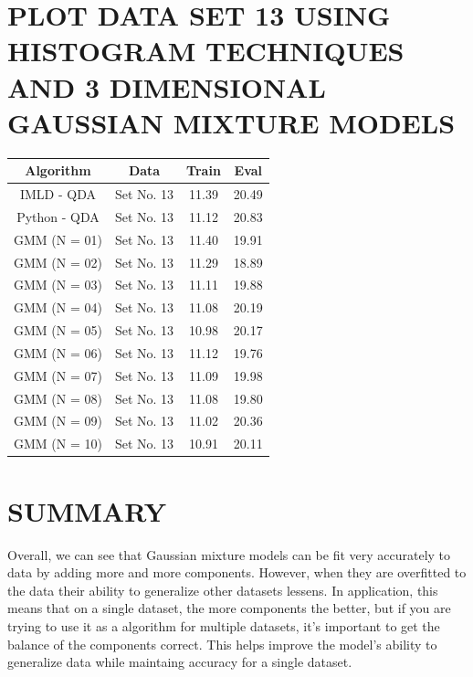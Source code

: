 \documentclass{article}
\begin{document}
\section{\MakeUppercase{Plot data set 13 using histogram techniques and 3 dimensional Gaussian mixture models}}
\begin{table}[ht]
\centering
\renewcommand{\arraystretch}{1.5}
\begin{tabular}{|c|c|c|c|}
	\hline
	\rowcolor{gray!20}
	Algorithm & Data & Train & Eval\\
	\hline 
	IMLD - QDA   & Set No. 13 & 11.39 & 20.49\\
	\hline
	Python - QDA & Set No. 13 & 11.12 & 20.83\\
	\hline
	GMM (N = 01) & Set No. 13 & 11.40 & 19.91\\
	\hline
	GMM (N = 02) & Set No. 13 & 11.29 & 18.89\\
	\hline
	GMM (N = 03) & Set No. 13 & 11.11 & 19.88\\
	\hline
	GMM (N = 04) & Set No. 13 & 11.08 & 20.19\\
	\hline
	GMM (N = 05) & Set No. 13 & 10.98 & 20.17\\
	\hline
	GMM (N = 06) & Set No. 13 & 11.12 & 19.76\\
	\hline
	GMM (N = 07) & Set No. 13 & 11.09 & 19.98\\
	\hline
	GMM (N = 08) & Set No. 13 & 11.08 & 19.80\\
	\hline
	GMM (N = 09) & Set No. 13 & 11.02 & 20.36\\
	\hline
	GMM (N = 10) & Set No. 13 & 10.91 & 20.11\\
	\hline
	\end{tabular}
\end{table}

\section{\MakeUppercase{Summary}}
Overall, we can see that Gaussian mixture models can be fit very accurately to data by adding more and more components. However, when they are overfitted to the data their ability to generalize other datasets lessens. In application, this means that on a single dataset, the more components the better, but if you are trying to use it as a algorithm for multiple datasets, it's important to get the balance of the components correct. This helps improve the model's ability to generalize data while maintaing accuracy for a single dataset.
\end{document}
